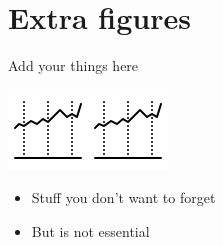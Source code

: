 \documentclass[12pt,a4paper]{article}
\begin{document}
\parbox[t][0.55\paperheight][t]{0.3\linewidth}{
    \section*{Extra figures}
    
    {\scriptsize
    Add your things here
    
    \includegraphics[width=0.5\linewidth]{icons8-stocks-80.png}\includegraphics[width=0.5\linewidth]{icons8-stocks-80.png}
    
    \begin{itemize}
    \setlength\itemsep{0.1em}
        \item Stuff you don't want to forget
        \item But is not essential
    \end{itemize}
    }
}

\end{document}
